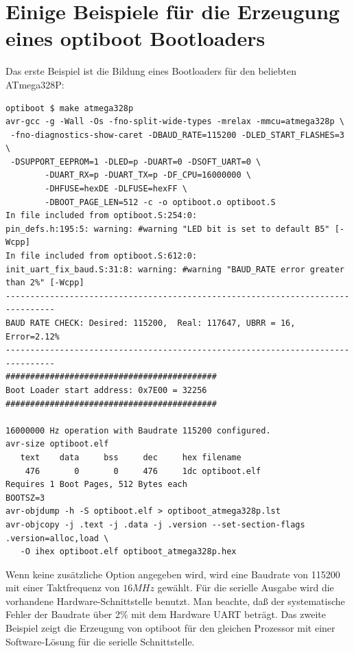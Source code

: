 \section{Einige Beispiele für die Erzeugung eines optiboot Bootloaders}

Das erste Beispiel ist die Bildung eines Bootloaders für den beliebten ATmega328P:

\begin{verbatim}
optiboot $ make atmega328p
avr-gcc -g -Wall -Os -fno-split-wide-types -mrelax -mmcu=atmega328p \
 -fno-diagnostics-show-caret -DBAUD_RATE=115200 -DLED_START_FLASHES=3 \
 -DSUPPORT_EEPROM=1 -DLED=p -DUART=0 -DSOFT_UART=0 \
        -DUART_RX=p -DUART_TX=p -DF_CPU=16000000 \
        -DHFUSE=hexDE -DLFUSE=hexFF \
        -DBOOT_PAGE_LEN=512 -c -o optiboot.o optiboot.S
In file included from optiboot.S:254:0:
pin_defs.h:195:5: warning: #warning "LED bit is set to default B5" [-Wcpp]
In file included from optiboot.S:612:0:
init_uart_fix_baud.S:31:8: warning: #warning "BAUD_RATE error greater than 2%" [-Wcpp]
--------------------------------------------------------------------------------
BAUD RATE CHECK: Desired: 115200,  Real: 117647, UBRR = 16, Error=2.12%
--------------------------------------------------------------------------------
###########################################
Boot Loader start address: 0x7E00 = 32256
###########################################

16000000 Hz operation with Baudrate 115200 configured.
avr-size optiboot.elf
   text	   data	    bss	    dec	    hex	filename
    476	      0	      0	    476	    1dc	optiboot.elf
Requires 1 Boot Pages, 512 Bytes each
BOOTSZ=3
avr-objdump -h -S optiboot.elf > optiboot_atmega328p.lst
avr-objcopy -j .text -j .data -j .version --set-section-flags .version=alloc,load \
   -O ihex optiboot.elf optiboot_atmega328p.hex
\end{verbatim}

Wenn keine zusätzliche Option angegeben wird, wird eine Baudrate von 115200 mit einer Taktfrequenz von \(16 MHz\) gewählt.
Für die serielle Ausgabe wird die vorhandene Hardware-Schnittstelle benutzt. 
Man beachte, daß der systematische Fehler der Baudrate über 2\% mit dem Hardware UART beträgt.
Das zweite Beispiel zeigt die Erzeugung von optiboot für den gleichen Prozessor mit einer Software-Lösung
für die serielle Schnittstelle.

